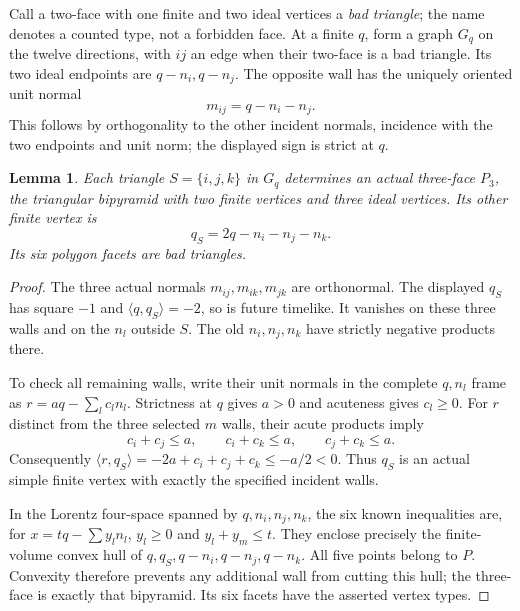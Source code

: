 \documentclass[11pt]{article}
\newtheorem{lemma}[theorem]{Lemma}
\newcommand{\ip}[2]{\langle #1,#2\rangle}
\newcommand{\Pthree}{P_3}
\begin{document}
Call a two-face with one finite and two ideal vertices a
\emph{bad triangle}; the name denotes a counted type, not a forbidden
face. At a finite $q$, form a graph $G_q$ on the twelve directions,
with $ij$ an edge when their two-face is a bad triangle.
Its two ideal endpoints are $q-n_i,q-n_j$. The opposite wall has
the uniquely oriented unit normal
\begin{equation}\label{eq:badwall}
 m_{ij}=q-n_i-n_j.
\end{equation}
This follows by orthogonality to the other incident normals, incidence
with the two endpoints and unit norm; the displayed sign is strict
at $q$.

\begin{lemma}\label{lem:P3}
Each triangle $S=\{i,j,k\}$ in $G_q$ determines an actual three-face
$\Pthree$, the triangular bipyramid with two finite vertices and three
ideal vertices. Its other finite vertex is
\begin{equation}\label{eq:opposite}
 q_S=2q-n_i-n_j-n_k.
\end{equation}
Its six polygon facets are bad triangles.
\end{lemma}
\begin{proof}
The three actual normals $m_{ij},m_{ik},m_{jk}$ are orthonormal.
The displayed $q_S$ has square $-1$ and $\ip{q}{q_S}=-2$, so
is future timelike. It vanishes on these three walls and on the
$n_l$ outside $S$. The old $n_i,n_j,n_k$ have strictly negative
products there.

To check all remaining walls, write their unit normals in the complete
$q,n_l$ frame as $r=a q-\sum_l c_l n_l$. Strictness at $q$ gives
$a>0$ and acuteness gives $c_l\ge0$. For $r$ distinct from the
three selected $m$ walls, their acute products imply
\[
 c_i+c_j\le a,\qquad c_i+c_k\le a,\qquad c_j+c_k\le a.
\]
Consequently $\ip{r}{q_S}=-2a+c_i+c_j+c_k\le-a/2<0$.
Thus $q_S$ is an actual simple finite vertex with exactly the
specified incident walls.

In the Lorentz four-space spanned by $q,n_i,n_j,n_k$, the six
known inequalities are, for $x=tq-\sum y_l n_l$,
$y_l\ge0$ and $y_l+y_m\le t$. They enclose precisely the
finite-volume convex hull of $q,q_S,q-n_i,q-n_j,q-n_k$.
All five points belong to $P$. Convexity therefore prevents any
additional wall from cutting this hull; the three-face is exactly
that bipyramid. Its six facets have the asserted vertex types.
\end{proof}
\end{document}
